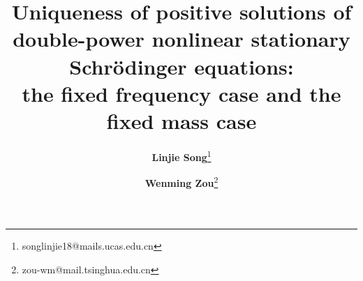 \documentclass{article}
\theoremstyle{definition} \theoremstyle{remark}
\numberwithin{equation}{section}
\begin{document}
\title{{\bf Uniqueness of positive solutions of double-power nonlinear stationary Schr\"odinger equations:} 	
\\the fixed frequency case and the fixed mass case
}
	
	
	\author{{\bf Linjie Song}\footnote{songlinjie18@mails.ucas.edu.cn} }
	
	
	\author{{\bf Wenming Zou}\footnote{zou-wm@mail.tsinghua.edu.cn} }
	
	
	
	
	\date{}	
	\maketitle
	
\end{document}
